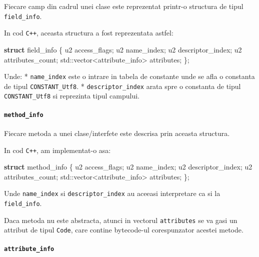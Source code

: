 \documentclass[]{article}
\newenvironment{Shaded}{}{}
\newcommand{\KeywordTok}[1]{\textcolor[rgb]{0.00,0.44,0.13}{\textbf{#1}}}
\newcommand{\BuiltInTok}[1]{#1}
\newcommand{\NormalTok}[1]{#1}
\let\oldparagraph\paragraph
\renewcommand{\paragraph}[1]{\oldparagraph{#1}\mbox{}}
\begin{document}
Fiecare camp din cadrul unei clase este reprezentat printr-o structura
de tipul \texttt{field\_info}.

In cod \texttt{C++}, aceasta structura a fost reprezentata astfel:

\begin{Shaded}
	\begin{Highlighting}[]
		\KeywordTok{struct}\NormalTok{ field_info \{}
		\NormalTok{    u2 access_flags;}
		\NormalTok{    u2 name_index;}
		\NormalTok{    u2 descriptor_index;}
		\NormalTok{    u2 attributes_count;}
		\BuiltInTok{std::}\NormalTok{vector<attribute_info> attributes;}
		\NormalTok{\};}
	\end{Highlighting}
\end{Shaded}

Unde: * \texttt{name\_index} este o intrare in tabela de constante unde
se afla o constanta de tipul \texttt{CONSTANT\_Utf8}. *
\texttt{descriptor\_index} arata spre o constanta de tipul
\texttt{CONSTANT\_Utf8} si reprezinta tipul campului.

\paragraph{\texorpdfstring{\texttt{method\_info}}{method\_info}}\label{method_info}

Fiecare metoda a unei clase/interfete este descrisa prin aceasta
structura.

In cod \texttt{C++}, am implementat-o asa:

\begin{Shaded}
	\begin{Highlighting}[]
		\KeywordTok{struct}\NormalTok{ method_info \{}
		\NormalTok{    u2 access_flags;}
		\NormalTok{    u2 name_index;}
		\NormalTok{    u2 descriptor_index;}
		\NormalTok{    u2 attributes_count;}
		\BuiltInTok{std::}\NormalTok{vector<attribute_info> attributes;}
		\NormalTok{\};}
	\end{Highlighting}
\end{Shaded}

Unde \texttt{name\_index} si \texttt{descriptor\_index} au aceeasi
interpretare ca si la \texttt{field\_info}.

Daca metoda nu este abstracta, atunci in vectorul \texttt{attributes} se
va gasi un attribut de tipul \texttt{Code}, care contine bytecode-ul
corespunzator acestei metode.

\paragraph{\texorpdfstring{\texttt{attribute\_info}}{attribute\_info}}\label{attribute_info}
\end{document}
